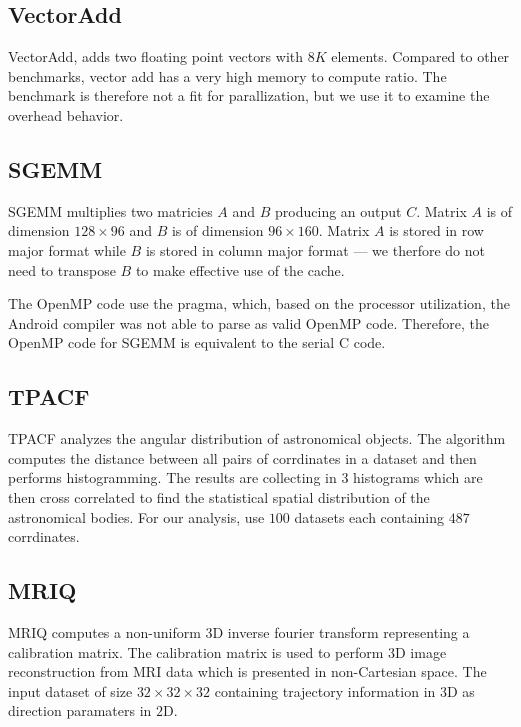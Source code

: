 \subsection{VectorAdd}

VectorAdd, adds two floating point vectors with $8K$ elements.
Compared to other benchmarks, vector add has a very high memory to compute ratio.
The benchmark is therefore not a fit for parallization, but we use it to examine
  the overhead behavior.

\subsection{SGEMM}

SGEMM multiplies two matricies $A$ and $B$ producing an output $C$.
Matrix $A$ is of dimension $128 \times 96$ and $B$ is of dimension $96 \times 160$.
Matrix $A$ is stored in row major format while $B$ is stored in column major format ---
	we therfore do not need to transpose $B$ to make effective use of the cache.

The OpenMP code use the 
	pragma, which, based on the processor utilization,
	the Android compiler was not able to parse as valid OpenMP code.
Therefore, the OpenMP code for SGEMM is equivalent to the serial C code.

\subsection{TPACF}

TPACF analyzes the angular distribution of astronomical objects.
The algorithm computes the distance between all pairs of corrdinates in a dataset
	and then performs histogramming.
The results are collecting in 3 histograms which are then cross correlated to find
	the statistical spatial distribution of the astronomical bodies.
For our analysis, use $100$ datasets each containing $487$ corrdinates.

\subsection{MRIQ}

MRIQ computes a non-uniform 3D inverse fourier transform representing a calibration matrix.
The calibration matrix is used to perform 3D image reconstruction from MRI data which is 
	presented in non-Cartesian space.
The input dataset of size $32 \times 32 \times 32$ containing trajectory information in $3$D
	as direction paramaters in $2$D.

